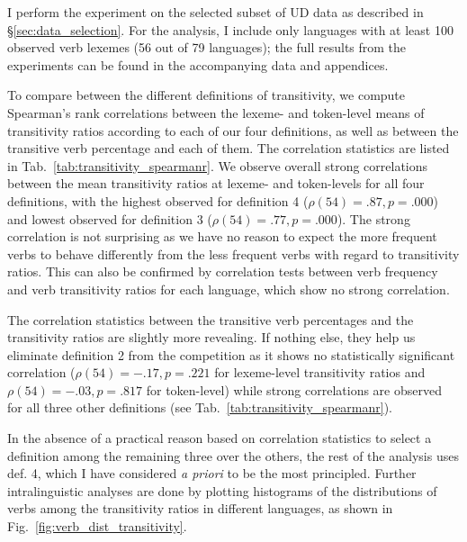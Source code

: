 I perform the experiment on the selected subset of UD data as described in §\ref{sec:data_selection}. For the analysis, I include only languages with at least 100 observed verb lexemes (56 out of 79 languages); the full results from the experiments can be found in the accompanying data and appendices. 



To compare between the different definitions of transitivity, we compute Spearman's rank correlations between the lexeme- and token-level means of transitivity ratios according to each of our four definitions, as well as between the transitive verb percentage and each of them. The correlation statistics are listed in Tab.~\ref{tab:transitivity_spearmanr}. We observe overall strong correlations between the mean transitivity ratios at lexeme- and token-levels for all four definitions, with the highest observed for definition 4 ($\rho(54)=.87, p=.000$) and lowest observed for definition 3 ($\rho(54)=.77, p=.000$). The strong correlation is not surprising as we have no reason to expect the more frequent verbs to behave differently from the less frequent verbs with regard to transitivity ratios. This can also be confirmed by correlation tests between verb frequency and verb transitivity ratios for each language, which show no strong correlation.

The correlation statistics between the transitive verb percentages and the transitivity ratios are slightly more revealing. If nothing else, they help us eliminate definition 2 from the competition as it shows no statistically significant correlation ($\rho(54)=-.17, p=.221$ for lexeme-level transitivity ratios and $\rho(54)=-.03, p=.817$ for token-level) while strong correlations are observed for all three other definitions (see Tab.~\ref{tab:transitivity_spearmanr}).

In the absence of a practical reason based on correlation statistics to select a definition among the remaining three over the others, the rest of the analysis uses def. 4, which I have considered \textit{a priori} to be the most principled. Further intralinguistic analyses are done by plotting histograms of the distributions of verbs among the transitivity ratios in different languages, as shown in Fig.~\ref{fig:verb_dist_transitivity}.

